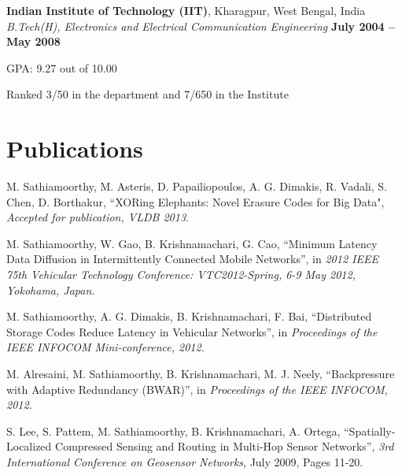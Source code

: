 \documentclass[margin,line]{resume}
\begin{document}
\begin{resume}
    
    \textbf{Indian Institute of Technology (IIT)}, Kharagpur, West Bengal, India \\%
    \textsl{B.Tech(H), Electronics and Electrical Communication Engineering} \hfill \textbf{ July 2004 -- May 2008}\vspace{-3mm}\\\vspace{-1mm}%
    \begin{list2}
    		\item GPA:	9.27 out of 10.00
    		\item Ranked 3/50 in the department and 7/650 in the Institute        
    \end{list2}\vspace{-1.5mm}%


\section{\mysidestyle Publications}
\begin{list2}
   \item M. Sathiamoorthy, 
             M. Asteris,
             D. Papailiopoulos,
             A. G. Dimakis,
             R. Vadali,
             S. Chen,
             D. Borthakur, ``XORing Elephants: Novel Erasure Codes for Big Data", \textsl{Accepted for publication, VLDB 2013}.
      \item M. Sathiamoorthy, W. Gao, B. Krishnamachari, G. Cao,
    ``Minimum Latency Data Diffusion in Intermittently Connected Mobile Networks'', in
    \textsl{2012 IEEE 75th Vehicular Technology Conference: VTC2012-Spring, 6-9 May 2012, Yokohama, Japan.}
    \item M. Sathiamoorthy, A. G. Dimakis, B. Krishnamachari, F. Bai, 
    ``Distributed Storage Codes Reduce Latency in Vehicular Networks'', in
    \textsl{Proceedings of the IEEE INFOCOM Mini-conference, 2012.}
    \item M. Alresaini, M. Sathiamoorthy, B. Krishnamachari, M. J. Neely, ``Backpressure with Adaptive Redundancy (BWAR)'', 
    in \textsl{Proceedings of the IEEE INFOCOM, 2012.}
    \item S. Lee, S. Pattem, M. Sathiamoorthy, B. Krishnamachari, A. Ortega, ``Spatially-Localized Compressed Sensing and Routing in Multi-Hop Sensor Networks'', \textsl{3rd International Conference on Geosensor Networks}, July 2009, Pages 11-20.  
    \end{list2}


\end{resume}
\end{document}
